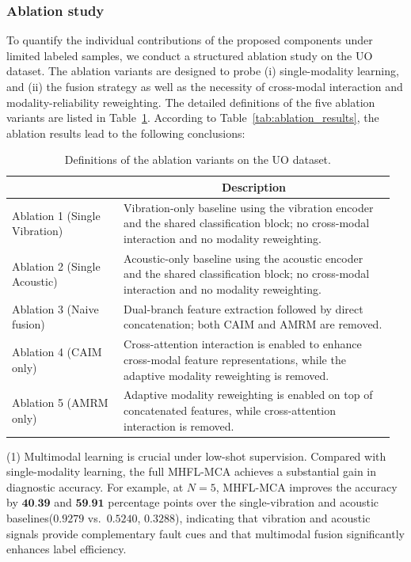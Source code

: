 \documentclass[a4paper]{cas-sc}
\begin{document}
\subsubsection{Ablation study}
To quantify the individual contributions of the proposed components under limited labeled samples,
we conduct a structured ablation study on the UO dataset. The ablation variants are designed to probe (i) single-modality learning, and (ii) the fusion strategy as well as
the necessity of cross-modal interaction and modality-reliability reweighting. The detailed definitions of the five ablation variants are listed in Table~\ref{tab:uo_ablation_defs}. According to Table~\ref{tab:ablation_results}, the ablation results lead to the following conclusions:

\begin{table}[pos=htbp]
\centering
\small
\renewcommand{\arraystretch}{1.15}
\setlength{\tabcolsep}{4pt}
\caption{Definitions of the ablation variants on the UO dataset.}
\label{tab:uo_ablation_defs}
\begin{tabular}{@{}>{\centering\arraybackslash}p{0.28\linewidth} p{0.68\linewidth}@{}}
\toprule
\multicolumn{1}{c}{Method} & \multicolumn{1}{c}{Description} \\
\midrule
Ablation 1 (Single Vibration) &
Vibration-only baseline using the vibration encoder and the shared classification block; no cross-modal interaction and no modality reweighting. \\
\midrule
Ablation 2 (Single Acoustic) &
Acoustic-only baseline using the acoustic encoder and the shared classification block; no cross-modal interaction and no modality reweighting. \\
\midrule
Ablation 3 (Naive fusion) &
Dual-branch feature extraction followed by direct concatenation; both CAIM and AMRM are removed. \\
\midrule
Ablation 4 (CAIM only) &
Cross-attention interaction is enabled to enhance cross-modal feature representations, while the adaptive modality reweighting is removed. \\
\midrule
Ablation 5 (AMRM only) &
Adaptive modality reweighting is enabled on top of concatenated features, while cross-attention interaction is removed. \\
\bottomrule
\end{tabular}

\end{table}

(1) Multimodal learning is crucial under low-shot supervision. Compared with single-modality learning, the full MHFL-MCA achieves a substantial gain in diagnostic accuracy. For example, at $N=5$, MHFL-MCA improves the accuracy by $\textbf{40.39}$ and $\textbf{59.91}$ percentage points over the single-vibration and acoustic baselines($0.9279$ vs.\ $0.5240$, $0.3288$), indicating that vibration and acoustic signals provide complementary fault cues and that multimodal fusion significantly enhances label efficiency.
\end{document}
